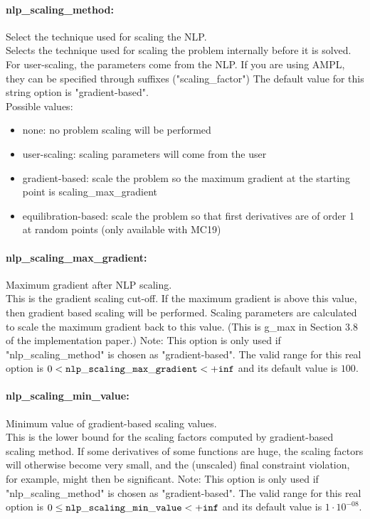 \paragraph{nlp\_scaling\_method:}\label{opt:nlp_scaling_method} Select the technique used for scaling the NLP. \\
 Selects the technique used for scaling the
problem internally before it is solved. For
user-scaling, the parameters come from the NLP.
If you are using AMPL, they can be specified
through suffixes ("scaling\_factor") The default value for this string option is "gradient-based".
\\ 
Possible values:
\begin{itemize}
   \item none: no problem scaling will be performed
   \item user-scaling: scaling parameters will come from the user
   \item gradient-based: scale the problem so the maximum gradient at
the starting point is scaling\_max\_gradient
   \item equilibration-based: scale the problem so that first derivatives are
of order 1 at random points (only available
with MC19)
\end{itemize}

\paragraph{nlp\_scaling\_max\_gradient:}\label{opt:nlp_scaling_max_gradient} Maximum gradient after NLP scaling. \\
 This is the gradient scaling cut-off. If the
maximum gradient is above this value, then
gradient based scaling will be performed. Scaling
parameters are calculated to scale the maximum
gradient back to this value. (This is g\_max in
Section 3.8 of the implementation paper.) Note:
This option is only used if
"nlp\_scaling\_method" is chosen as
"gradient-based". The valid range for this real option is 
$0 <  {\tt nlp\_scaling\_max\_gradient } <  {\tt +inf}$
and its default value is $100$.


\paragraph{nlp\_scaling\_min\_value:}\label{opt:nlp_scaling_min_value} Minimum value of gradient-based scaling values. \\
 This is the lower bound for the scaling factors
computed by gradient-based scaling method.  If
some derivatives of some functions are huge, the
scaling factors will otherwise become very small,
and the (unscaled) final constraint violation,
for example, might then be significant.  Note:
This option is only used if
"nlp\_scaling\_method" is chosen as
"gradient-based". The valid range for this real option is 
$0 \le {\tt nlp\_scaling\_min\_value } <  {\tt +inf}$
and its default value is $1 \cdot 10^{-08}$.


